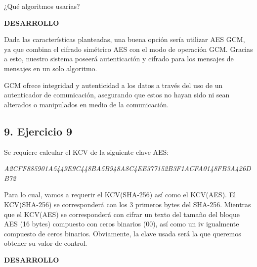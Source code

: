 \documentclass[12pt,oneside,a4paper]{book}
\newcommand{\newsection}[1]{{\subsection*{#1}
\addcontentsline{toc}{section}{#1}}}
\begin{document}
\vspace{1em}

¿Qué algoritmos usarías?

\vspace{2em}

\hspace{20pt} \textbf{DESARROLLO}

\vspace{1em}

\hspace{20pt}
Dada las características planteadas, una buena opción sería utilizar AES GCM, ya que combina el cifrado simétrico AES con el modo de operación GCM. Gracias a esto, nuestro sistema poseerá autenticación y cifrado para los mensajes de mensajes en un solo algoritmo. 

\vspace{1em}

\hspace{20pt}
GCM ofrece integridad y autenticidad a los datos a través del uso de un autenticador de comunicación, asegurando que estos no hayan sido ni sean alterados o manipulados en medio de la comunicación.

\newpage

\newsection{9. Ejercicio 9}

\vspace{2em}

Se requiere calcular el KCV de la siguiente clave AES:

\vspace{1em}

\textit{A2CFF885901A5449E9C448BA5B948A8C4EE377152B3F1ACFA0148FB3A426DB72}

\vspace{1em}

Para lo cual, vamos a requerir el KCV(SHA-256) así como el KCV(AES). El KCV(SHA-256) se
corresponderá con los 3 primeros bytes del SHA-256. Mientras que el KCV(AES) se
corresponderá con cifrar un texto del tamaño del bloque AES (16 bytes) compuesto con
ceros binarios (00), así como un iv igualmente compuesto de ceros binarios. Obviamente, la
clave usada será la que queremos obtener su valor de control.

\vspace{2em}

\hspace{20pt} \textbf{DESARROLLO}

\vspace{1em}
\end{document}

